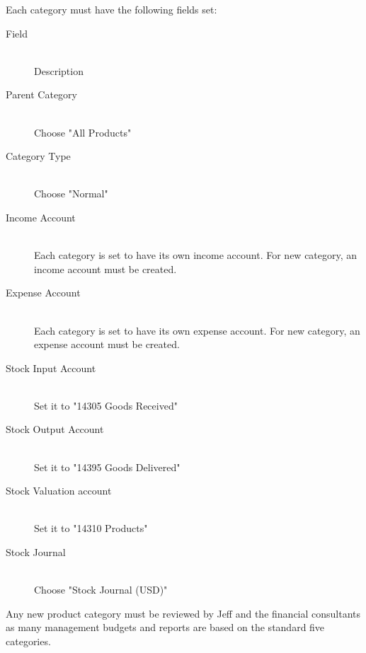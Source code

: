 Each category must have the following fields set:

\begin{description}
\item[Field] \hfill \\
Description
\item[Parent Category] \hfill \\
Choose "All Products"
\item[Category Type] \hfill \\
Choose "Normal"
\item[Income Account] \hfill \\
Each category is set to have its own income account. For new category, an income account must be created.
\item[Expense Account] \hfill \\
Each category is set to have its own expense account. For new category, an expense account must be created.
\item[Stock Input Account] \hfill \\
Set it to "14305 Goods Received"
\item[Stock Output Account] \hfill \\
Set it to "14395 Goods Delivered"
\item[Stock Valuation account] \hfill \\
Set it to "14310 Products"
\item[Stock Journal] \hfill \\
Choose "Stock Journal (USD)"
\end{description}

Any new product category must be reviewed by Jeff and the financial consultants as many management budgets and reports are based on the standard five categories.
